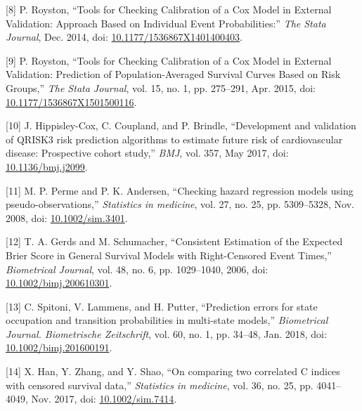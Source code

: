 \documentclass[
]{article}
\newenvironment{cslreferences}%
  {}%
  {\par}
\begin{document}
\begin{cslreferences}
\leavevmode\hypertarget{ref-royston_tools_2014}{}%
{[}8{]} P. Royston, ``Tools for Checking Calibration of a Cox Model in External Validation: Approach Based on Individual Event Probabilities:'' \emph{The Stata Journal}, Dec. 2014, doi: \href{https://doi.org/10.1177/1536867X1401400403}{10.1177/1536867X1401400403}.

\leavevmode\hypertarget{ref-royston_tools_2015}{}%
{[}9{]} P. Royston, ``Tools for Checking Calibration of a Cox Model in External Validation: Prediction of Population-Averaged Survival Curves Based on Risk Groups,'' \emph{The Stata Journal}, vol. 15, no. 1, pp. 275--291, Apr. 2015, doi: \href{https://doi.org/10.1177/1536867X1501500116}{10.1177/1536867X1501500116}.

\leavevmode\hypertarget{ref-hippisley-cox_development_2017}{}%
{[}10{]} J. Hippisley-Cox, C. Coupland, and P. Brindle, ``Development and validation of QRISK3 risk prediction algorithms to estimate future risk of cardiovascular disease: Prospective cohort study,'' \emph{BMJ}, vol. 357, May 2017, doi: \href{https://doi.org/10.1136/bmj.j2099}{10.1136/bmj.j2099}.

\leavevmode\hypertarget{ref-perme_checking_2008}{}%
{[}11{]} M. P. Perme and P. K. Andersen, ``Checking hazard regression models using pseudo-observations,'' \emph{Statistics in medicine}, vol. 27, no. 25, pp. 5309--5328, Nov. 2008, doi: \href{https://doi.org/10.1002/sim.3401}{10.1002/sim.3401}.

\leavevmode\hypertarget{ref-gerds_consistent_2006}{}%
{[}12{]} T. A. Gerds and M. Schumacher, ``Consistent Estimation of the Expected Brier Score in General Survival Models with Right-Censored Event Times,'' \emph{Biometrical Journal}, vol. 48, no. 6, pp. 1029--1040, 2006, doi: \href{https://doi.org/10.1002/bimj.200610301}{10.1002/bimj.200610301}.

\leavevmode\hypertarget{ref-spitoni_prediction_2018}{}%
{[}13{]} C. Spitoni, V. Lammens, and H. Putter, ``Prediction errors for state occupation and transition probabilities in multi-state models,'' \emph{Biometrical Journal. Biometrische Zeitschrift}, vol. 60, no. 1, pp. 34--48, Jan. 2018, doi: \href{https://doi.org/10.1002/bimj.201600191}{10.1002/bimj.201600191}.

\leavevmode\hypertarget{ref-han_comparing_2017}{}%
{[}14{]} X. Han, Y. Zhang, and Y. Shao, ``On comparing two correlated C indices with censored survival data,'' \emph{Statistics in medicine}, vol. 36, no. 25, pp. 4041--4049, Nov. 2017, doi: \href{https://doi.org/10.1002/sim.7414}{10.1002/sim.7414}.


\end{cslreferences}
\end{document}
